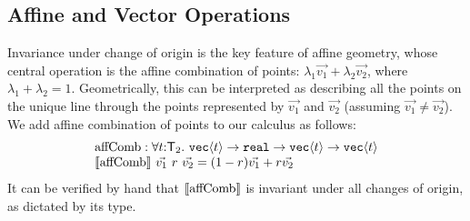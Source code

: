 \subsection{Affine and Vector Operations}
\label{sec:affine-vector-ops}

Invariance under change of origin is the key feature of affine
geometry, whose central operation is the affine combination of points:
$\lambda_1\vec{v_1} + \lambda_2\vec{v_2}$, where $\lambda_1 +
\lambda_2 = 1$.  Geometrically, this can be interpreted as describing
all the points on the unique line through the points represented by
$\vec{v_1}$ and $\vec{v_2}$ (assuming $\vec{v_1} \not= \vec{v_2}$).
We add affine combination of points to our calculus as
follows: %
\begin{displaymath}
  \begin{array}{l}
    \mathrm{affComb} :\forall t \mathord:
    \mathsf{T}_2.\ \textup{\texttt{vec}}\langle t \rangle \to \textup{\texttt{real}} \to
    \textup{\texttt{vec}}\langle t \rangle \to \textup{\texttt{vec}}\langle t \rangle \\ 
    \llbracket \mathrm{affComb} \rrbracket\ \vec{v_1}\ r\ \vec{v_2} = (1-r)\vec{v_1} +
    r\vec{v_2} 
\end{array}
\end{displaymath}
It can be verified by hand that %
$\llbracket \mathrm{affComb} \rrbracket$ is invariant under all changes of origin, as
dictated by its type.

